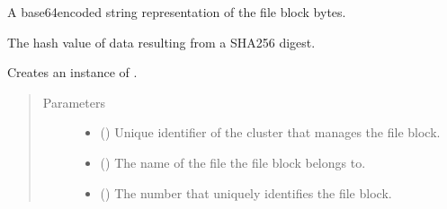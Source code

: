 \documentclass[letterpaper,10pt,english]{sphinxmanual}
\begin{document}
\begin{fulllineitems}

\begin{fulllineitems}
\label{\detokenize{app.domain.helpers:app.domain.helpers.smart_dataclasses.FileBlockData.data}}
A base64\sphinxhyphen{}encoded string representation of the file block bytes.

\end{fulllineitems}


\begin{fulllineitems}
\label{\detokenize{app.domain.helpers:app.domain.helpers.smart_dataclasses.FileBlockData.sha256}}
The hash value of data resulting from a SHA256 digest.

\end{fulllineitems}


\begin{fulllineitems}
\label{\detokenize{app.domain.helpers:app.domain.helpers.smart_dataclasses.FileBlockData.__init__}}
Creates an instance of .
\begin{quote}\begin{description}
\item[{Parameters}] \leavevmode\begin{itemize}
\item {} 
 () \textendash{} Unique identifier of the cluster that manages the file block.

\item {} 
 () \textendash{} The name of the file the file block belongs to.

\item {} 
 () \textendash{} The number that uniquely identifies the file block.


\end{itemize}
\end{description}
\end{quote}
\end{fulllineitems}
\end{fulllineitems}
\end{document}
